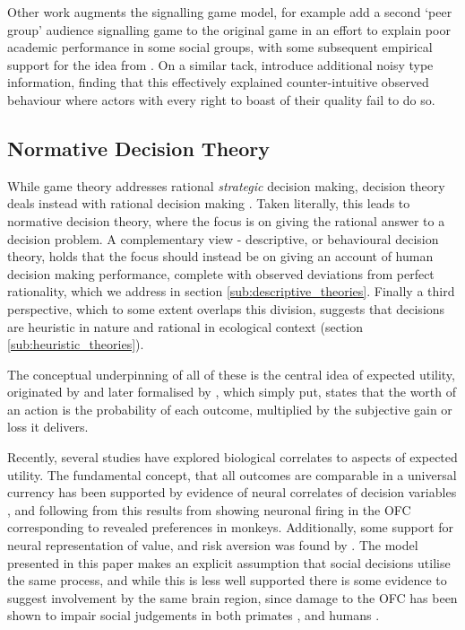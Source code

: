 Other work augments the signalling game model, for example \citet{Austen-Smith2005} add a second `peer group' audience signalling game to the original \citeauthor{Spence1973} game in an effort to explain poor academic performance in some social groups, with some subsequent empirical support for the idea from \citet{Jr2010}. On a similar tack, \citet{Feltovich2002} introduce additional noisy type information, finding that this effectively explained counter-intuitive observed behaviour where actors with every right to boast of their quality fail to do so.

\subsection{Normative Decision Theory}

While game theory addresses rational \emph{strategic} decision making, decision theory deals instead with rational decision making \citep{Peterson2009}.  Taken literally, this leads to normative decision theory, where the focus is on giving the rational answer to a decision problem. A complementary view - descriptive, or behavioural decision theory, holds that the focus should instead be on giving an account of human decision making performance, complete with observed deviations from perfect rationality, which we address in section \ref{sub:descriptive_theories}. Finally a third perspective, which to some extent overlaps this division, suggests that decisions are heuristic in nature and rational in ecological context \citep{Gigerenzer1996} (section \ref{sub:heuristic_theories}).

The conceptual underpinning of all of these is the central idea of expected utility, originated by \citet{Bernoulli1954} and later formalised by \citet{Neumann1953}, which simply put, states that the worth of an action is the probability of each outcome, multiplied by the subjective gain or loss it delivers.

Recently, several studies have explored biological correlates to aspects of expected utility. The fundamental concept, that all outcomes are comparable in a universal currency has been supported by evidence of neural correlates of decision variables \citep{Platt1999}, and following from this results from \citet{Padoa-Schioppa2006,Padoa-Schioppa2008} showing neuronal firing in the \ac{OFC} corresponding to revealed preferences in monkeys. Additionally, some support for neural representation of value, and risk aversion was found by \citet{Christopoulos2009}. The model presented in this paper makes an explicit assumption that social decisions utilise the same process, and while this is less well supported there is some evidence to suggest involvement by the same brain region, since damage to the \ac{OFC} has been shown to impair social judgements in both primates \citep{Watson2012}, and humans \citep{Willis2010}.

